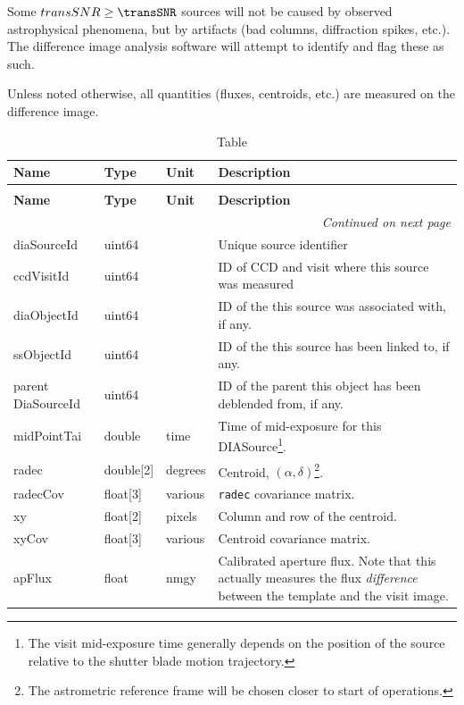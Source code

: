 \documentclass[SE,lsstdraft,toc]{lsstdoc}
\newcommand{\oldtext}[1]{{\color{red} #1}}
\newcommand{\newtext}[1]{{\color{blue} #1}}
\newcommand{\marginreq}[1]{\marginpar{\hspace{0pt}\tiny #1}}
\newcommand{\dmreq}[1]{\marginreq{DMS-REQ-#1}}
\newenvironment{schema}[3]{%
\setlength\LTleft{0pt}
\setlength\LTright{\fill}
\begin{longtable}{p{0.2\textwidth}p{0.14\textwidth}p{0.14\textwidth}p{0.41\textwidth}}

\caption[#1]{#2\label{#3}}\\

\hline \textbf{Name} & \textbf{Type} & \textbf{Unit} & \textbf{Description}\\ \hline
\endfirsthead

\caption[#1]{#2}\\

\hline \textbf{Name} & \textbf{Type} & \textbf{Unit} & \textbf{Description}\\ \hline
\endhead

\hline \multicolumn{4}{r}{\emph{Continued on next page}} \\
\endfoot

\hline\hline
\endlastfoot
}{%
\hline
\end{longtable}
}
\begin{document}
Some $transSNR \geq \transSNR$ sources will not be caused by observed astrophysical phenomena, but by artifacts (bad columns, diffraction spikes, etc.). The difference image analysis software will attempt to identify and flag these as such.

Unless noted otherwise, all \DIASource quantities (fluxes, centroids, etc.) are measured on the difference image.

\dmreq{0269}

\begin{schema}{\DIASource Table}{\DIASource Table}{tbl:diasourceTable}

diaSourceId & uint64 & ~ & Unique source identifier \\

ccdVisitId & uint64 & ~ & ID of CCD and visit where this source was measured \\

diaObjectId & uint64 & ~ & ID of the \DIAObject this source was associated with, if any. \\

ssObjectId & uint64 & ~ & ID of the \SSObject this source has been linked to, if any. \\

parent\newtext{Dia}SourceId & uint64 & ~ & ID of the parent \oldtext{\Source}\newtext{\DIASource} this object has been deblended from, if any. \\

midPointTai & double & time & Time of mid-exposure for this DIASource\footnote{The visit mid-exposure
time generally depends on the position of the source relative to the shutter blade motion trajectory.}. \\

radec & double[2] & degrees & Centroid, $(\alpha, \delta)$\footnote{The astrometric reference frame will be chosen closer to start of operations.}. \\

radecCov & float[3] & various & \texttt{radec} covariance matrix. \\

xy & float[2] & pixels & Column and row of the centroid. \\

xyCov & float[3] & various & Centroid covariance matrix. \\

apFlux & float & nmgy & Calibrated aperture flux. Note that this actually measures
the flux \emph{difference} between the template and the visit image. \\


\end{schema}
\end{document}
